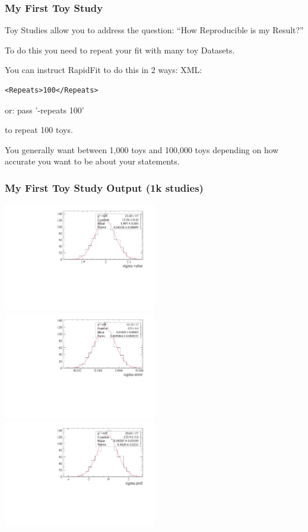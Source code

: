\documentclass{beamer}
\begin{document}
\begin{frame}[fragile]
\frametitle{My First Toy Study}

Toy Studies allow you to address the question:\newline
``How Reproducible is my Result?''\newline\newline

To do this you need to repeat your fit with many toy Datasets.\newline

You can instruct RapidFit to do this in 2 ways:
XML:
\begin{lstlisting}[tabsize=8]
<Repeats>100</Repeats>
\end{lstlisting}
or:\newline
pass '-repeats 100'\newline

to repeat 100 toys.

You generally want between 1,000 toys and 100,000 toys depending on how accurate you want to be about your statements.

\end{frame}

\begin{frame}
\frametitle{My First Toy Study Output (1k studies) }\begin{center}
\includegraphics[width=0.5\textwidth]{./Output-1k/sigma_value_c_thru.pdf}
\includegraphics[width=0.5\textwidth]{./Output-1k/sigma_error_c_thru.pdf}\newline
\includegraphics[width=0.5\textwidth]{./Output-1k/sigma_pull_c_thru.pdf}\end{center}
\end{frame}
\end{document}
